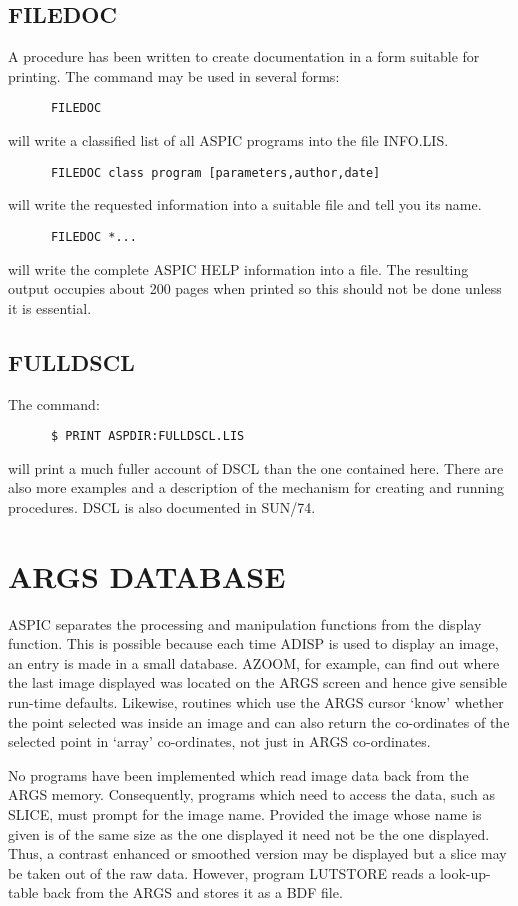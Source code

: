 \subsection {FILEDOC}
A procedure has been written to create documentation in a form suitable for
printing.
The command may be used in several forms:
\begin{verbatim}
      FILEDOC
\end{verbatim}
will write a classified list of all ASPIC programs into the file INFO.LIS.
\begin{verbatim}
      FILEDOC class program [parameters,author,date]
\end{verbatim}
will write the requested information into a suitable file and tell you its
name.
\begin{verbatim}
      FILEDOC *...
\end{verbatim}
will write the complete ASPIC HELP information into a file.
The resulting output occupies about 200 pages when printed so this should not be
done unless it is essential.
\subsection {FULLDSCL}
The command:
\begin{verbatim}
      $ PRINT ASPDIR:FULLDSCL.LIS
\end{verbatim}
will print a much fuller account of DSCL than the one contained here.
There are also more examples and a description of the mechanism for creating
and running procedures.
DSCL is also documented in SUN/74.

\section {ARGS DATABASE}

ASPIC separates the processing and manipulation functions from the display
function.
This is possible because each time ADISP is used to display an image, an
entry is made in a small database.
AZOOM, for example, can find out where the last image displayed was located on
the ARGS screen and hence give sensible run-time defaults.
Likewise, routines which use the ARGS cursor `know' whether the point selected
was inside an image and can also return the co-ordinates of the selected point
in `array' co-ordinates, not just in ARGS co-ordinates.

No programs have been implemented which read image data back from the ARGS
memory.
Consequently, programs which need to access the data, such as SLICE, must
prompt for the image name.
Provided the image whose name is given is of the same size as the one displayed
it need not be the one displayed.
Thus, a contrast enhanced or smoothed version may be displayed but a slice may
be taken out of the raw data.
However, program LUTSTORE reads a look-up-table back from the ARGS and stores it
as a BDF file.

